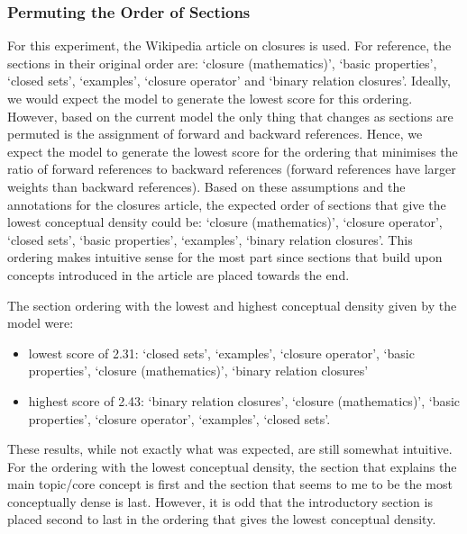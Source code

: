 \documentclass[12pt]{article}
\theoremstyle{grammarstyle}
\begin{document}
\subsubsection{Permuting the Order of Sections} \label{sec:permuting_the_order_of_sections_results}
For this experiment, the Wikipedia article on closures \citep{wiki:closure} is used.
For reference, the sections in their original order are: `closure (mathematics)', `basic properties', `closed sets', `examples', `closure operator' and `binary relation closures'.
Ideally, we would expect the model to generate the lowest score for this ordering.
However, based on the current model the only thing that changes as sections are permuted is the assignment of forward and backward references.
Hence, we expect the model to generate the lowest score for the ordering that minimises the ratio of forward references to backward references (forward references have larger weights than backward references).
Based on these assumptions and the annotations for the closures article, the expected order of sections that give the lowest conceptual density could be:
`closure (mathematics)', `closure operator', `closed sets', `basic properties', `examples', `binary relation closures'.
This ordering makes intuitive sense for the most part since sections that build upon concepts introduced in the article are placed towards the end.

The section ordering with the lowest and highest conceptual density given by the model were:
\begin{itemize}
    \item lowest score of 2.31: `closed sets', `examples', `closure operator', `basic properties', `closure (mathematics)', `binary relation closures'
    \item highest score of 2.43: `binary relation closures', `closure (mathematics)', `basic properties', `closure operator', `examples', `closed sets'.

\end{itemize}

These results, while not exactly what was expected, are still somewhat intuitive. For the ordering with the lowest conceptual density, the section that explains the main topic/core concept is first and the section that seems to me to be the most conceptually dense is last. However, it is odd that the introductory section is placed second to last in the ordering that gives the lowest conceptual density.
\end{document}
